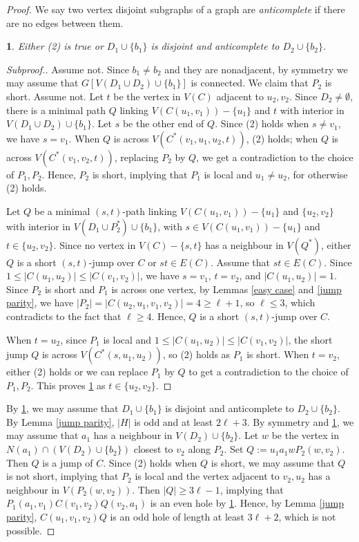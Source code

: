 \documentclass[11pt]{article}
\newtheorem{claim}{}[theorem]
\begin{document}
\begin{proof}
We say two vertex disjoint subgraphs of a graph are {\em anticomplete} if there are no edges between them.
\begin{claim}\label{d1d2}
Either (2) is true or $D_1\cup\{b_1\}$ is disjoint and anticomplete to $D_2\cup\{b_2\}$.
\end{claim}
\begin{proof}[Subproof.]
Assume not. Since $b_1\neq b_2$ and they are nonadjacent, by symmetry we may assume that $G[V(D_1\cup D_2)\cup\{b_1\}]$ is connected. We claim that $P_2$ is short. Assume not. Let $t$ be the vertex in $V(C)$ adjacent to $u_2,v_2$. Since $D_2\neq\emptyset$, there is a minimal path $Q$ linking $V(C(u_1,v_1))-\{u_1\}$ and $t$ with interior in $V(D_1\cup D_2)\cup\{b_1\}$. Let $s$ be the other end of $Q$. Since (2) holds when $s\neq v_1$, we have $s=v_1$. When $Q$ is across $V(C^*(v_1,u_1, u_2,t))$, (2)  holds; when $Q$ is across $V(C^*(v_1,v_2, t))$, replacing $P_2$ by $Q$,  we get a contradiction to the choice of $P_1, P_2$. Hence, $P_2$ is short, implying that $P_1$ is local and $u_1\neq u_2$, for otherwise (2) holds.

Let $Q$ be a minimal $(s,t)$-path linking $V(C(u_1,v_1))-\{u_1\}$ and $\{u_2,v_2\}$ with interior in $V(D_1\cup P^*_2)\cup\{b_1\}$, with $s\in V(C(u_1,v_1))-\{u_1\}$ and $t\in \{u_2,v_2\}$. Since no vertex in $V(C)-\{s,t\}$ has a neighbour in $V(Q^*)$, either $Q$ is a short $(s,t)$-jump over $C$ or $st\in E(C)$. Assume that $st\in E(C)$. Since $1\leq |C(u_1,u_2)|\leq |C(v_1,v_2)|$, we have $s=v_1$, $t=v_2$, and $|C(u_1,u_2)|=1$. Since $P_2$ is short and $P_1$ is across one vertex, by Lemmas \ref{easy case} and \ref{jump parity}, we have $|P_2|=|C(u_2,u_1,v_1,v_2)|=4\geq\ell+1$, so $\ell\leq 3$, which contradicts to the fact that $\ell\geq4$. Hence, $Q$ is a short $(s,t)$-jump over $C$.

When $t=u_2$, since $P_1$ is local and $1\leq|C(u_1,u_2)|\leq |C(v_1,v_2)|$, the short jump $Q$ is across $V(C^*(s,u_1, u_2))$, so (2) holds as $P_1$ is short. When $t=v_2$,  either (2) holds or we can replace $P_1$ by $Q$ to get a contradiction to the choice of $P_1,P_2$. This proves \ref{d1d2} as $t\in \{u_2,v_2\}$.
\end{proof}
By \ref{d1d2}, we may assume that $D_1\cup\{b_1\}$ is disjoint and anticomplete to $D_2\cup\{b_2\}$. By Lemma \ref{jump parity}, $|H|$ is odd and at least $2\ell+3$. By symmetry and \ref{d1d2}, we may assume that $a_1$ has a neighbour in $V(D_2)\cup\{b_2\}$. Let $w$ be the vertex in $N(a_1)\cap (V(D_2)\cup\{b_2\})$ closest to $v_2$ along $P_2$. Set $Q:=u_1a_1wP_2(w,v_2)$. Then $Q$ is a jump of $C$. Since (2) holds when $Q$ is short, we may assume that 
$Q$ is not short, implying that $P_2$ is local and the vertex adjacent to $v_2, u_2$ has a neighbour in $V(P_2(w,v_2))$. Then $|Q|\geq 3\ell-1$, implying that $P_1(a_1,v_1)C(v_1,v_2)Q(v_2,a_1)$ is an even hole by \ref{d1d2}. Hence, by Lemma \ref{jump parity}, $C(u_1,v_1,v_2)Q$ is an odd hole of length at least $3\ell+2$, which is not possible.
\end{proof}
\end{document}
